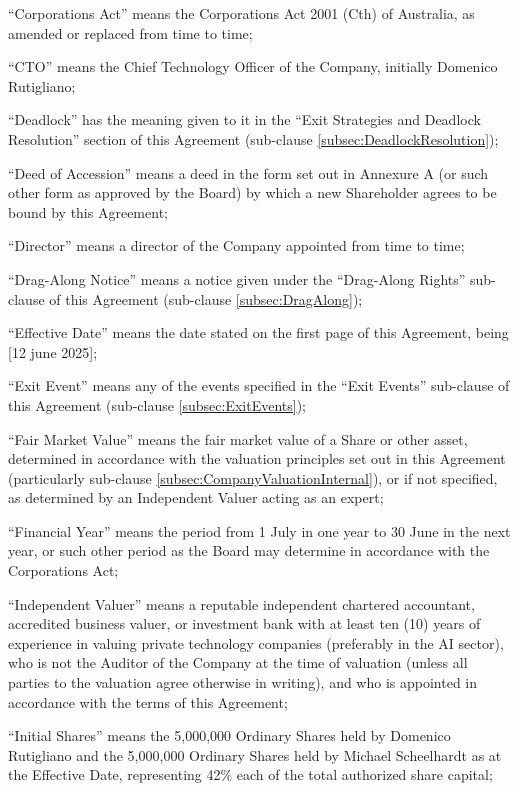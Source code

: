 ``Corporations Act'' means the Corporations Act 2001 (Cth) of Australia, as amended or replaced from time to time;

``CTO'' means the Chief Technology Officer of the Company, initially Domenico Rutigliano;

``Deadlock'' has the meaning given to it in the ``Exit Strategies and Deadlock Resolution'' section of this Agreement (sub-clause \ref{subsec:DeadlockResolution});

``Deed of Accession'' means a deed in the form set out in Annexure A (or such other form as approved by the Board) by which a new Shareholder agrees to be bound by this Agreement;

``Director'' means a director of the Company appointed from time to time;

``Drag-Along Notice'' means a notice given under the ``Drag-Along Rights'' sub-clause of this Agreement (sub-clause \ref{subsec:DragAlong});

``Effective Date'' means the date stated on the first page of this Agreement, being [12 june 2025];

``Exit Event'' means any of the events specified in the ``Exit Events'' sub-clause of this Agreement (sub-clause \ref{subsec:ExitEvents});

``Fair Market Value'' means the fair market value of a Share or other asset, determined in accordance with the valuation principles set out in this Agreement (particularly sub-clause \ref{subsec:CompanyValuationInternal}), or if not specified, as determined by an Independent Valuer acting as an expert;

``Financial Year'' means the period from 1 July in one year to 30 June in the next year, or such other period as the Board may determine in accordance with the Corporations Act;

``Independent Valuer'' means a reputable independent chartered accountant, accredited business valuer, or investment bank with at least ten (10) years of experience in valuing private technology companies (preferably in the AI sector), who is not the Auditor of the Company at the time of valuation (unless all parties to the valuation agree otherwise in writing), and who is appointed in accordance with the terms of this Agreement;

``Initial Shares'' means the 5,000,000 Ordinary Shares held by Domenico Rutigliano and the 5,000,000 Ordinary Shares held by Michael Scheelhardt as at the Effective Date, representing 42\% each of the total authorized share capital;

